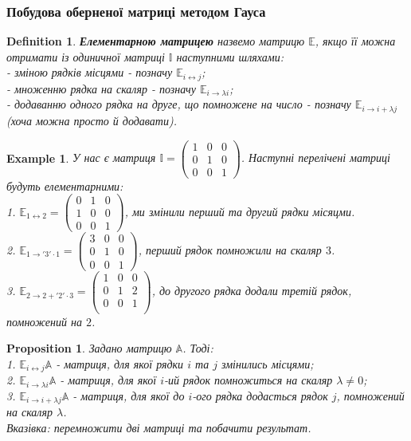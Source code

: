 \documentclass[a4paper, 10pt]{article}
\theoremstyle{theoremdd}
\theoremstyle{theoremdd}
\newtheorem{definition}[theorem]{Definition}
\theoremstyle{theoremdd}
\theoremstyle{theoremdd}
\newtheorem{example}[theorem]{Example}
\theoremstyle{theoremdd}
\newtheorem{proposition}[theorem]{Proposition}
\theoremstyle{theoremdd}
\theoremstyle{theoremdd}
\theoremstyle{theoremdd}
\begin{document}
\subsubsection*{Побудова оберненої матриці методом Гауса}
\begin{definition}
\textbf{Елементарною матрицею} назвемо матрицю $\mathbb{E}$, якщо її можна отримати із одиничної матриці $\mathbb{I}$ наступними шляхами:\\
	- зміною рядків місцями - позначу $\mathbb{E}_{i \leftrightarrow j}$;\\
	- множенню рядка на скаляр - позначу $\mathbb{E}_{i \rightarrow \lambda i}$;\\
	- додаванню одного рядка на друге, що помножене на число - позначу $\mathbb{E}_{i \rightarrow i + \lambda j}$ (хоча можна просто й додавати).
\end{definition}

\begin{example}
	У нас є матриця $\mathbb{I} = \begin{pmatrix}
	1 & 0 & 0 \\
	0 & 1 & 0 \\
	0 & 0 & 1
	\end{pmatrix}$. Наступні перелічені матриці будуть елементарними:\\
	1. $\mathbb{E}_{1 \leftrightarrow 2} = \begin{pmatrix}
	0 & 1 & 0 \\
	1 & 0 & 0 \\
	0 & 0 & 1 
	\end{pmatrix}$, ми змінили перший та другий рядки місяцми.\\
	2. $\mathbb{E}_{1 \rightarrow '3' \cdot 1} = \begin{pmatrix}
	3 & 0 & 0 \\
	0 & 1 & 0 \\
	0 & 0 & 1
	\end{pmatrix}$, перший рядок помножили на скаляр $3$.\\
	3. $\mathbb{E}_{2 \rightarrow 2 + '2'\cdot 3} = \begin{pmatrix}
	1 & 0 & 0 \\
	0 & 1 & 2 \\
	0 & 0 & 1 \\
	\end{pmatrix}$, до другого рядка додали третій рядок, помножений на $2$.
\end{example}

\begin{proposition}
Задано матрицю $\mathbb{A}$. Тоді:\\
	1. $\mathbb{E}_{i \leftrightarrow j}\mathbb{A}$ - матриця, для якої рядки $i$ та $j$ змінились місцями;\\
	2. $\mathbb{E}_{i \rightarrow \lambda i}\mathbb{A}$ - матриця, для якої $i$-ий рядок помножиться на скаляр $\lambda \neq 0$;\\
	3. $\mathbb{E}_{i \rightarrow i + \lambda j}\mathbb{A}$ - матриця, для якої до $i$-ого рядка додасться рядок $j$, помножений на скаляр $\lambda$.\\
	\textit{Вказівка: перемножити дві матриці та побачити результат.}
\end{proposition}
\end{document}
